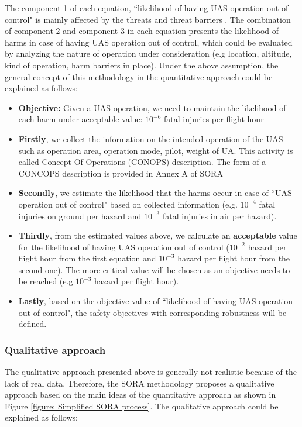 \documentclass[a4paper, 10, conference]{ieeeconf}  %
\begin{document}
The component 1 of each equation, ``likelihood of having UAS operation out of control" is mainly affected by the threats and threat barriers \cite{SORAV1}. The combination of component 2 and component 3 in each equation presents the likelihood of harms in case of having UAS operation out of control, which could be evaluated by analyzing the nature of operation under consideration (e.g location, altitude, kind of operation, harm barriers in place). Under the above assumption, the general concept of this methodology in the quantitative approach could be explained as follows:
  \begin{itemize}
  	\item \textbf{Objective:} Given a UAS operation, we need to maintain the likelihood of each harm under acceptable value: $10^{-6}$ fatal injuries per flight hour
  	\item \textbf{Firstly}, we collect the information on the intended operation of the UAS such as operation area, operation mode, pilot, weight of UA. This activity is called Concept Of Operations (CONOPS) description. The form of a CONCOPS description is provided in Annex A of SORA
  	\item \textbf{Secondly}, we estimate the likelihood that the harms occur in case of ``UAS operation out of control" based on collected information (e.g. $10^{-4}$ fatal injuries on ground per hazard and $10^{-3}$ fatal injuries in air per hazard).
  	\item \textbf{Thirdly}, from the estimated values above, we calculate an \textbf{acceptable} value for the likelihood of having UAS operation out of control ($10^{-2}$ hazard per flight hour from the first equation and $10^{-3}$ hazard per flight hour from the second one). The more critical value will be chosen as an objective needs to be reached (e.g $10^{-3}$ hazard per flight hour).
  	\item \textbf{Lastly}, based on the objective value of ``likelihood of having UAS operation out of control", the safety objectives with corresponding robustness will be defined. 
  \end{itemize}


\subsubsection{Qualitative approach}

The qualitative approach presented above is generally not realistic because of the lack of real data. Therefore, the SORA methodology proposes a qualitative approach based on the main ideas of the quantitative approach as shown in Figure \ref{figure: Simplified SORA process}. The qualitative approach could be explained as follows:
\end{document}
